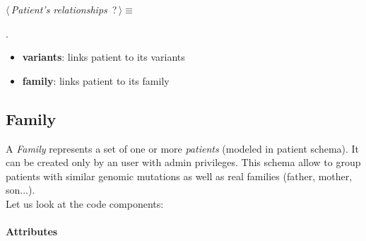 	\begin{flushleft} \small
\begin{minipage}{\linewidth}\label{scrap14}\raggedright\small
{} $\langle\,${\itshape {Patient's relationships}}\nobreak\ {\footnotesize {?}}$\,\rangle\equiv$
\vspace{-1ex}
\begin{list}{}{} \item

                
        {\NWsep}
\end{list}
\vspace{-1.5ex}
\footnotesize
\begin{list}{}{\setlength{\itemsep}{-\parsep}\setlength{\itemindent}{-\leftmargin}}
\item {\NWtxtMacroNoRef}.

\item{}
\end{list}
\end{minipage}\vspace{4ex}
\end{flushleft}
\begin{itemize}
 	\item \textbf{variants}: links patient to its variants
 	\item \textbf{family}: links patient to its family
\end{itemize}


\subsection{Family}
A \emph{Family} represents a set of one or more \emph{patients} (modeled in patient schema). It can be created only by an user with admin privileges. This schema allow to group patients with similar genomic mutations as well as real families (father, mother, son{...}).
\\Let us look at the code components:

\newpage

\paragraph{Attributes}      

